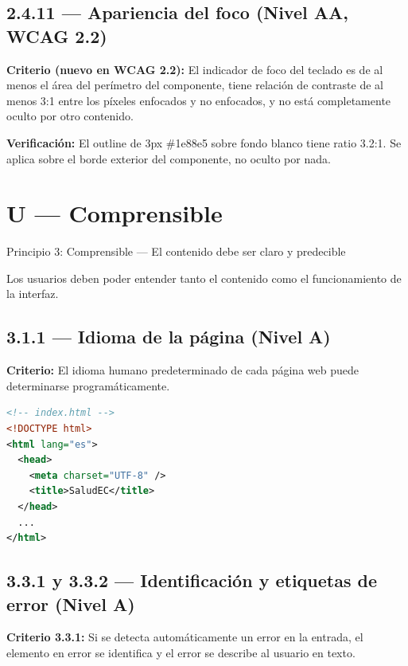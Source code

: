 \documentclass[12pt, a4paper]{article}
\begin{document}
\subsection{2.4.11 --- Apariencia del foco (Nivel AA, WCAG 2.2)}

\textbf{Criterio (nuevo en WCAG 2.2):} El indicador de foco del teclado es de al menos el área del perímetro del componente, tiene relación de contraste de al menos 3:1 entre los píxeles enfocados y no enfocados, y no está completamente oculto por otro contenido.

\textbf{Verificación:} El outline de 3px \#1e88e5 sobre fondo blanco tiene ratio 3.2:1. Se aplica sobre el borde exterior del componente, no oculto por nada.

\section{U --- Comprensible}

\begin{princbox}[purplemod]{Principio 3: Comprensible --- El contenido debe ser claro y predecible}

Los usuarios deben poder entender tanto el contenido como el funcionamiento de la interfaz.
\end{princbox}

\subsection{3.1.1 --- Idioma de la página (Nivel A)}

\textbf{Criterio:} El idioma humano predeterminado de cada página web puede determinarse programáticamente.

\begin{evidbox}
\begin{lstlisting}[language=XML]
<!-- index.html -->
<!DOCTYPE html>
<html lang="es">
  <head>
    <meta charset="UTF-8" />
    <title>SaludEC</title>
  </head>
  ...
</html>
\end{lstlisting}
\end{evidbox}

\subsection{3.3.1 y 3.3.2 --- Identificación y etiquetas de error (Nivel A)}

\textbf{Criterio 3.3.1:} Si se detecta automáticamente un error en la entrada, el elemento en error se identifica y el error se describe al usuario en texto.
\end{document}
